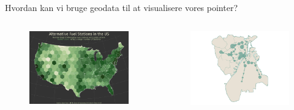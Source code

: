 \documentclass[
  8pt,
  ignorenonframetext,
  aspectratio=169]{beamer}
\newcommand{\columnsbegin}{\begin{columns}}
\newcommand{\columnsend}{\end{columns}}
\begin{document}
\begin{frame}{Hvordan kan vi bruge geodata til at visualisere vores
pointer?}
\protect\hypertarget{hvordan-kan-vi-bruge-geodata-til-at-visualisere-vores-pointer}{}
\columnsbegin


\begin{figure}[H]
    \centering
    \includegraphics[width=.90\textwidth]{pictures/fuel.png}
\end{figure}


\begin{figure}[H]
    \centering
    \includegraphics[width=.90\textwidth]{pictures/Forstadsbilister_start.png}
\end{figure}

\columnsend
\end{frame}
\end{document}
